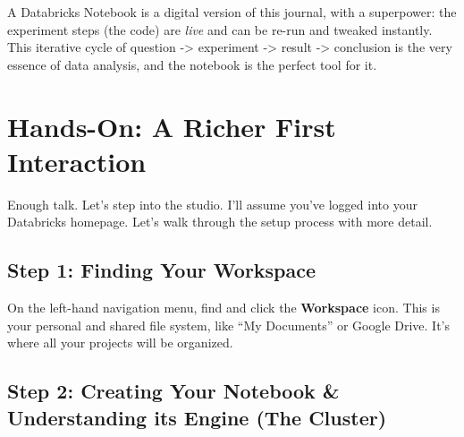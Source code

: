 \documentclass[
  letterpaper,
  DIV=11,
  numbers=noendperiod]{scrreprt}
\begin{document}
A Databricks Notebook is a digital version of this journal, with a
superpower: the experiment steps (the code) are \emph{live} and can be
re-run and tweaked instantly. This iterative cycle of question
-\textgreater{} experiment -\textgreater{} result -\textgreater{}
conclusion is the very essence of data analysis, and the notebook is the
perfect tool for it.

\section*{Hands-On: A Richer First
Interaction}\label{hands-on-a-richer-first-interaction}


Enough talk. Let's step into the studio. I'll assume you've logged into
your Databricks homepage. Let's walk through the setup process with more
detail.

\subsection*{Step 1: Finding Your
Workspace}\label{step-1-finding-your-workspace}

On the left-hand navigation menu, find and click the \textbf{Workspace}
icon. This is your personal and shared file system, like ``My
Documents'' or Google Drive. It's where all your projects will be
organized.

\subsection*{Step 2: Creating Your Notebook \& Understanding its Engine
(The
Cluster)}\label{step-2-creating-your-notebook-understanding-its-engine-the-cluster}
\end{document}
